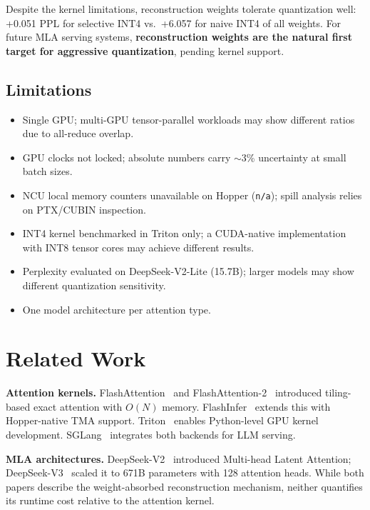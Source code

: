 \documentclass[10pt,twocolumn]{article}
\begin{document}
Despite the kernel limitations, reconstruction weights tolerate quantization well: +0.051 PPL for selective INT4 vs.\ +6.057 for naive INT4 of all weights.  For future MLA serving systems, \textbf{reconstruction weights are the natural first target for aggressive quantization}, pending kernel support.

\subsection{Limitations}

\begin{itemize}[leftmargin=*,topsep=0pt]
  \item Single GPU; multi-GPU tensor-parallel workloads may show different ratios due to all-reduce overlap.
  \item GPU clocks not locked; absolute numbers carry $\sim$3\% uncertainty at small batch sizes.
  \item NCU local memory counters unavailable on Hopper (\texttt{n/a}); spill analysis relies on PTX/CUBIN inspection.
  \item INT4 kernel benchmarked in Triton only; a CUDA-native implementation with INT8 tensor cores may achieve different results.
  \item Perplexity evaluated on DeepSeek-V2-Lite (15.7B); larger models may show different quantization sensitivity.
  \item One model architecture per attention type.
\end{itemize}

\section{Related Work}

\textbf{Attention kernels.}  FlashAttention~\cite{flashattention} and FlashAttention-2~\cite{flashattention2} introduced tiling-based exact attention with $O(N)$ memory.  FlashInfer~\cite{flashinfer} extends this with Hopper-native TMA support.  Triton~\cite{triton} enables Python-level GPU kernel development.  SGLang~\cite{sglang} integrates both backends for LLM serving.

\textbf{MLA architectures.}  DeepSeek-V2~\cite{deepseekv2} introduced Multi-head Latent Attention; DeepSeek-V3~\cite{deepseekv3} scaled it to 671B parameters with 128 attention heads.  While both papers describe the weight-absorbed reconstruction mechanism, neither quantifies its runtime cost relative to the attention kernel.
\end{document}
